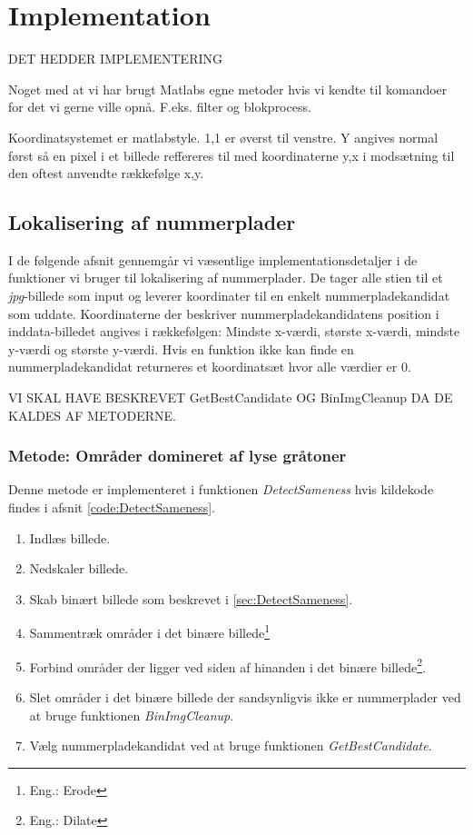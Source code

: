 \section{Implementation}
\label{sec:implementation}

DET HEDDER IMPLEMENTERING

Noget med at vi har brugt Matlabs egne metoder hvis vi kendte til komandoer for det vi gerne ville opnå. F.eks. filter og blokprocess.

Koordinatsystemet er matlabstyle. 1,1 er øverst til venstre. Y angives normal først så en pixel i et billede reffereres til med koordinaterne y,x i modsætning til den oftest anvendte rækkefølge x,y. 


\subsection{Lokalisering af nummerplader}
I de følgende afsnit gennemgår vi væsentlige implementationsdetaljer i de funktioner vi bruger til lokalisering af nummerplader. De tager alle stien til et \textit{jpg}-billede som input og leverer koordinater til en enkelt nummerpladekandidat som uddate. Koordinaterne der beskriver nummerpladekandidatens position i inddata-billedet angives i rækkefølgen: Mindste x-værdi, største x-værdi, mindste y-værdi og største y-værdi. Hvis en funktion ikke kan finde en nummerpladekandidat returneres et koordinatsæt hvor alle værdier er 0.

VI SKAL HAVE BESKREVET GetBestCandidate OG BinImgCleanup DA DE KALDES AF METODERNE.
\subsubsection{Metode: Områder domineret af lyse gråtoner}
Denne metode er implementeret i funktionen \textit{DetectSameness} hvis kildekode findes i afsnit \vref{code:DetectSameness}. 

\begin{enumerate}
\item Indlæs billede.
\item Nedskaler billede.
\item Skab binært billede som beskrevet i \ref{sec:DetectSameness}.
\item Sammentræk områder i det binære billede\footnote{Eng.: Erode}
\item Forbind områder der ligger ved siden af hinanden i det binære billede\footnote{Eng.: Dilate}.
\item Slet områder i det binære billede der sandsynligvis ikke er nummerplader ved at bruge funktionen \textit{BinImgCleanup}.
\item Vælg nummerpladekandidat ved at bruge funktionen \textit{GetBestCandidate}.
\end{enumerate}



